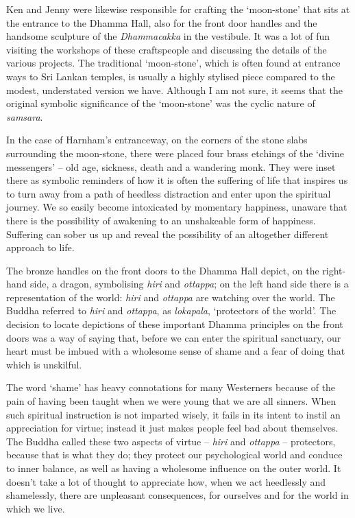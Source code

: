 Ken and Jenny were likewise responsible for crafting the `moon-stone'
that sits at the entrance to the Dhamma Hall, also for the front door
handles and the handsome sculpture of the \emph{Dhammacakka} in the vestibule.
It was a lot of fun visiting the workshops of these craftspeople and
discussing the details of the various projects. The traditional
`moon-stone', which is often found at entrance ways to Sri Lankan
temples, is usually a highly stylised piece compared to the modest,
understated version we have. Although I am not sure, it seems that the original symbolic
significance of the `moon-stone' was the cyclic nature of \emph{samsara}\cite{sandakada}.

In the case of Harnham's entranceway, on the corners of the stone slabs
surrounding the moon-stone, there were placed four brass etchings of the
`divine messengers\cite{divine}' -- old age, sickness, death and a wandering
monk. They were inset there as symbolic reminders of how it is often the
suffering of life that inspires us to turn away from a path of heedless
distraction and enter upon the spiritual journey. We so easily become
intoxicated by momentary happiness, unaware that there is the
possibility of awakening to an unshakeable form of happiness. Suffering
can sober us up and reveal the possibility of an altogether different
approach to life.

The bronze handles on the front doors to the Dhamma Hall depict, on the
right-hand side, a dragon, symbolising \emph{hiri} and \emph{ottappa}\cite{hiri};
on the left hand side there is a representation of the world: \emph{hiri} and
\emph{ottappa} are watching over the world. The Buddha referred to
\emph{hiri} and \emph{ottappa}, as \emph{lokapala}, `protectors of the world'.
The decision to locate depictions of these important Dhamma principles
on the front doors was a way of saying that, before we can enter the
spiritual sanctuary, our heart must be imbued with a wholesome sense of
shame and a fear of doing that which is unskilful.

The word `shame' has heavy connotations for many Westerners because of
the pain of having been taught when we were young that we are all
sinners. When such spiritual instruction is not imparted wisely, it
fails in its intent to instil an appreciation for virtue; instead it
just makes people feel bad about themselves. The Buddha called these two
aspects of virtue -- \emph{hiri} and \emph{ottappa} -- protectors,
because that is what they do; they protect our psychological world and
conduce to inner balance, as well as having a wholesome influence on the
outer world. It doesn't take a lot of thought to appreciate how, when we
act heedlessly and shamelessly, there are unpleasant consequences, for
ourselves and for the world in which we live.

